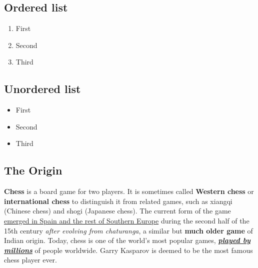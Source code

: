 \subsection{Ordered list}
\begin{enumerate}
    \item First
    \item Second
    \item Third
\end{enumerate}

\subsection{Unordered list}
\begin{itemize}
    \item First
    \item Second
    \item Third
\end{itemize}

\subsection{The Origin}
\textbf{Chess} is a board game for two players. It is sometimes called \textbf{Western chess} or \textbf{international chess} to distinguish it from related games, such as xiangqi (Chinese chess) and shogi (Japanese chess). The current form of the game \underline{emerged in Spain and the rest of Southern Europe} during the second half of the 15th century \textit{after evolving from chaturanga}, a similar but \textbf{much older game} of Indian origin. Today, chess is one of the world's most popular games, \textbf{\textit{\underline{played by millions}}} of people worldwide. Garry Kasparov is deemed to be the most famous chess player ever.